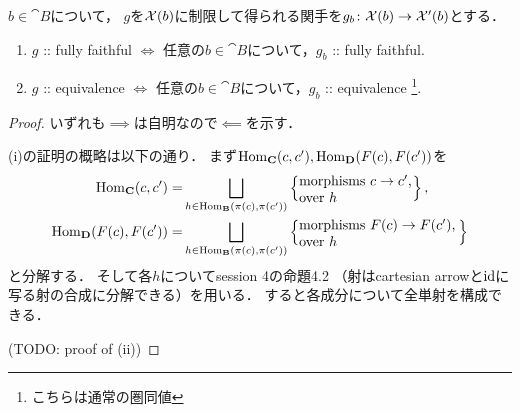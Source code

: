 \documentclass[a4paper, dvipdfmx]{jsarticle}
\begin{document}
    \begin{Prop}
        $b \in \cat{B}$について，
        $g$を$\mathcal{X}(b)$に制限して得られる関手を$g_b \colon \mathcal{X}(b) \to \mathcal{X}'(b)$とする．
        \begin{enumerate}[label=(\alph*)]
        \item $g$ :: fully faithful
                $\iff$ 任意の$b \in \cat{B}$について，$g_{b}$ :: fully faithful.
        \item $g$ :: equivalence
                $\iff$ 任意の$b \in \cat{B}$について，$g_{b}$ :: equivalence
                    \footnote{こちらは通常の圏同値}.
    \end{enumerate}
    \end{Prop}
    \begin{proof}
        いずれも$\implies$は自明なので$\impliedby$を示す．

        (i)の証明の概略は以下の通り．
        まず$\operatorname{Hom}_{\mathbf{C}}(c, c'), \operatorname{Hom}_{\mathbf{D}}(F(c), F(c'))$を
        \begin{align*}
            \Hom_{\cat{C}}(c, c')
            =&\bigsqcup_{h \in \Hom_{\cat{B}}(\pi(c), \pi(c'))}
            \left\{\parbox{2.85cm}{morphisms $c \to c'$, \\ \qquad\ \ over $h$}\right\}, \\
            \Hom_{\cat{D}}(F(c), F(c'))
            =&\bigsqcup_{h \in \Hom_{\cat{B}}(\pi(c), \pi(c'))}
            \left\{\parbox{4cm}{morphisms $F(c) \to F(c')$, \\ \qquad\qquad\ over $h$}\right\}
        \end{align*}
        と分解する．
        そして各$h$についてsession 4の命題4.2
        （射はcartesian arrowと$\mathrm{id}_{\!}$に写る射の合成に分解できる）を用いる．
        すると各成分について全単射を構成できる．

        (TODO: proof of (ii))
    \end{proof}



\end{document}
